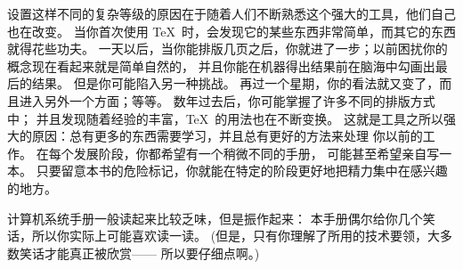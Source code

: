 {%
设置这样不同的复杂等级的原因在于随着人们不断熟悉这个强大的工具，他们自己也在\hbox{改变。}%
当你首次使用 \TeX\ 时，会发现它的某些东西非常简单，而其它的东西就得花些功夫。%
一天以后，当你能排版几页之后，你就进了一步；以前困扰你的概念现在看起来就是简单自然的，%
并且你能在机器得出结果前在脑海中勾画出最后的结果。%
但是你可能陷入另一种挑战。%
再过一个星期，你的看法就又变了，而且进入另外一个方面；等等。%
数年过去后，你可能掌握了许多不同的排版方式中；%
并且发现随着经验的丰富，\TeX\ 的用法也在不断变换。%
这就是工具之所以强大的原因：总有更多的东西需要学习，并且总有更好的方法来处理%
你以前的工作。%
在每个发展阶段，你都希望有一个稍微不同的手册，%
可能甚至希望亲自写一本。%
只要留意本书的危险标记，你就能在特定的阶段更好地把精力集中在感兴趣的地方。

计算机系统手册一般读起来比较乏味，但是振作起来：%
本手册偶尔给你几个笑话，所以你实际上可能喜欢读一读。%
(但是，只有你理解了所用的技术要领，大多数笑话才能真正被欣赏——%
所以要{仔细}点啊。)

}
